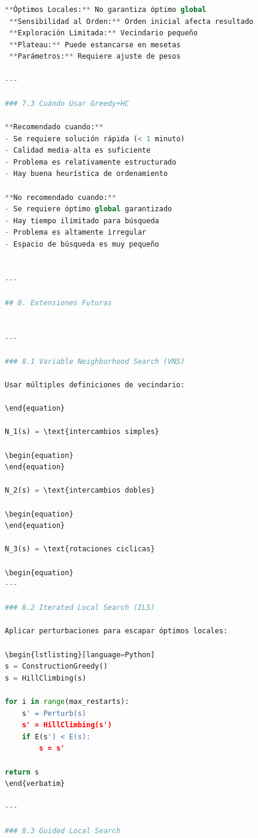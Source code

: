 \begin{itemize}
\begin{itemize}
\begin{itemize}
\begin{itemize}
\begin{itemize}
\begin{itemize}
\begin{enumerate}
\begin{enumerate}
\begin{enumerate}
\begin{enumerate}
\begin{lstlisting}[language=Python]
 **Óptimos Locales:** No garantiza óptimo global  
 **Sensibilidad al Orden:** Orden inicial afecta resultado  
 **Exploración Limitada:** Vecindario pequeño  
 **Plateau:** Puede estancarse en mesetas  
 **Parámetros:** Requiere ajuste de pesos 

---

### 7.3 Cuándo Usar Greedy+HC

**Recomendado cuando:**
- Se requiere solución rápida (< 1 minuto)
- Calidad media-alta es suficiente
- Problema es relativamente estructurado
- Hay buena heurística de ordenamiento

**No recomendado cuando:**
- Se requiere óptimo global garantizado
- Hay tiempo ilimitado para búsqueda
- Problema es altamente irregular
- Espacio de búsqueda es muy pequeño


---

## 8. Extensiones Futuras


---

### 8.1 Variable Neighborhood Search (VNS)

Usar múltiples definiciones de vecindario:

\end{equation}

N_1(s) = \text{intercambios simples}

\begin{equation}
\end{equation}

N_2(s) = \text{intercambios dobles}

\begin{equation}
\end{equation}

N_3(s) = \text{rotaciones ciclicas}

\begin{equation}
---

### 8.2 Iterated Local Search (ILS)

Aplicar perturbaciones para escapar óptimos locales:

\begin{lstlisting}[language=Python]
s = ConstructionGreedy()
s = HillClimbing(s)

for i in range(max_restarts):
    s' = Perturb(s)
    s' = HillClimbing(s')
    if E(s') < E(s):
        s = s'

return s
\end{verbatim}

---

### 8.3 Guided Local Search


\end{lstlisting}
\end{enumerate}
\end{enumerate}
\end{enumerate}
\end{enumerate}
\end{itemize}
\end{itemize}
\end{itemize}
\end{itemize}
\end{itemize}
\end{itemize}

